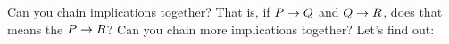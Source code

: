 \documentclass[11pt]{exam}
\begin{document}
\begin{questions}
% 
%   
%   

\question[6] Can you chain implications together?  That is, if $P \rightarrow Q$ and $Q \rightarrow R$, does that means the $P \rightarrow R$?  Can you chain more implications together?  Let's find out:
\end{questions}
\end{document}
